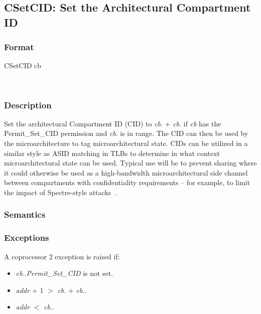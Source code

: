\clearpage
{}
{}
\subsection*{CSetCID: Set the Architectural Compartment ID}

\subsubsection*{Format}

CSetCID cb

%
\begin{center}
\\
\end{center}

\subsubsection*{Description}

Set the architectural Compartment ID (CID) to \emph{cb}.\cbase{} +
\emph{cb}.\coffset{} if \emph{cb} has the Permit\_Set\_CID permission and
\emph{cb}.\coffset{} is in range.
The CID can then be used by the microarchitecture to tag microarchitectural
state.
CIDs can be utilized in a similar style as ASID matching in TLBs to
determine in what context microarchitectural state can be used.
Typical use will be to prevent sharing where it could otherwise be used as a
high-bandwidth microarchitectural side channel between compartments with
confidentiality requirements -- for example, to limit the impact of
Spectre-style attacks~\cite{Kocher2018spectre}.

\subsubsection*{Semantics}


\subsubsection*{Exceptions}

A coprocessor 2 exception is raised if:

\begin{itemize}
\item
\emph{cb}.\cperms.\emph{Permit\_Set\_CID} is not set.
\item
\emph{addr} + 1 $>$ \emph{cb}.\cbase{} $+$ \emph{cb}.\clength{}.
\item
\emph{addr} $<$ \emph{cb}.\cbase{}.
\end{itemize}

